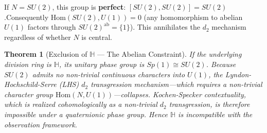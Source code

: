 \documentclass[11pt]{article}
\newtheorem{theorem}{Theorem}[section]
\begin{document}
If $N = SU(2)$, this group is \textbf{perfect}: $[SU(2), SU(2)] = SU(2)$.\linebreak Consequently $\mathrm{Hom}(SU(2), U(1)) = 0$ (any homomorphism to abelian $U(1)$ factors through $SU(2)^{\text{ab}} = \{1\}$). This annihilates the $d_2$ mechanism regardless of whether $N$ is central.

\begin{theorem}[Exclusion of $\mathbb{H}$ --- The Abelian Constraint]\label{thm:exclude-h}
If the underlying division ring is $\mathbb{H}$, its unitary phase group is $Sp(1) \cong SU(2)$. Because $SU(2)$ admits no non-trivial continuous characters into $U(1)$, the Lyndon-Hochschild-Serre (LHS) $d_2$ transgression mechanism---which requires a non-trivial character group $\mathrm{Hom}(N, U(1))$---collapses. Kochen-Specker contextuality, which is realized cohomologically as a non-trivial $d_2$ transgression, is therefore impossible under a quaternionic phase group. Hence $\mathbb{H}$ is incompatible with the observation framework.
\end{theorem}
\end{document}
